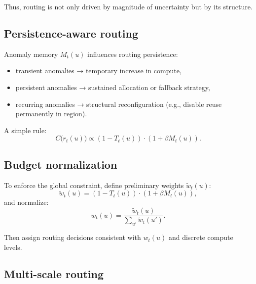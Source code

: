 \documentclass[11pt]{article}
\theoremstyle{definition}
\theoremstyle{plain}
\begin{document}
Thus, routing is not only driven by magnitude of uncertainty but by its structure.


\subsection{Persistence-aware routing}

Anomaly memory $M_t(u)$ influences routing persistence:
\begin{itemize}[leftmargin=1.5em]
    \item transient anomalies → temporary increase in compute,
    \item persistent anomalies → sustained allocation or fallback strategy,
    \item recurring anomalies → structural reconfiguration (e.g., disable reuse permanently in region).
\end{itemize}

A simple rule:
\begin{equation}
C\bigl(r_t(u)\bigr) \propto (1 - T_t(u)) \cdot (1 + \beta M_t(u)).
\end{equation}


\subsection{Budget normalization}

To enforce the global constraint, define preliminary weights $\tilde{w}_t(u)$:
\begin{equation}
\tilde{w}_t(u)=(1 - T_t(u))\cdot(1 + \beta M_t(u)),
\end{equation}
and normalize:
\begin{equation}
w_t(u)=\frac{\tilde{w}_t(u)}{\sum_{u'} \tilde{w}_t(u')}.
\end{equation}

Then assign routing decisions consistent with $w_t(u)$ and discrete compute levels.


\subsection{Multi-scale routing}
\end{document}
